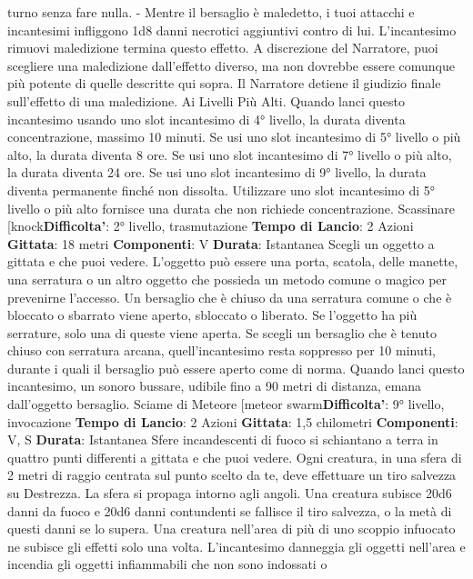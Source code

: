 \begin{multicols}{2}
turno senza fare nulla.
- Mentre il bersaglio è maledetto, i tuoi attacchi e
incantesimi infliggono 1d8 danni necrotici aggiuntivi
contro di lui.
L’incantesimo rimuovi maledizione termina questo
effetto. A discrezione del Narratore, puoi scegliere una
maledizione dall’effetto diverso, ma non dovrebbe
essere comunque più potente di quelle descritte qui
sopra. Il Narratore detiene il giudizio finale sull’effetto di una
maledizione.
Ai Livelli Più Alti. Quando lanci questo incantesimo
usando uno slot incantesimo di 4° livello, la durata
diventa concentrazione, massimo 10 minuti. Se usi uno
slot incantesimo di 5° livello o più alto, la durata diventa
8 ore. Se usi uno slot incantesimo di 7° livello o più alto,
la durata diventa 24 ore. Se usi uno slot incantesimo di
9° livello, la durata diventa permanente finché non
dissolta. Utilizzare uno slot incantesimo di 5° livello o
più alto fornisce una durata che non richiede
concentrazione.
Scassinare
[knock\textbf{Difficolta'}:
2° livello, trasmutazione
\textbf{Tempo di Lancio}: 2 Azioni
\textbf{Gittata}: 18 metri
\textbf{Componenti}: V
\textbf{Durata}: Istantanea
Scegli un oggetto a gittata e che puoi vedere. L’oggetto
può essere una porta, scatola, delle manette, una
serratura o un altro oggetto che possieda un metodo
comune o magico per prevenirne l’accesso.
Un bersaglio che è chiuso da una serratura comune o
che è bloccato o sbarrato viene aperto, sbloccato o
liberato. Se l’oggetto ha più serrature, solo una di
queste viene aperta.
Se scegli un bersaglio che è tenuto chiuso con
serratura arcana, quell’incantesimo resta soppresso per
10 minuti, durante i quali il bersaglio può essere aperto
come di norma.
Quando lanci questo incantesimo, un sonoro bussare,
udibile fino a 90 metri di distanza, emana dall’oggetto
bersaglio.
Sciame di Meteore
[meteor swarm\textbf{Difficolta'}:
9° livello, invocazione
\textbf{Tempo di Lancio}: 2 Azioni
\textbf{Gittata}: 1,5 chilometri
\textbf{Componenti}: V, S
\textbf{Durata}: Istantanea
Sfere incandescenti di fuoco si schiantano a terra in
quattro punti differenti a gittata e che puoi vedere. Ogni
creatura, in una sfera di 2 metri di raggio centrata sul
punto scelto da te, deve effettuare un tiro salvezza su
Destrezza. La sfera si propaga intorno agli angoli. Una
creatura subisce 20d6 danni da fuoco e 20d6 danni
contundenti se fallisce il tiro salvezza, o la metà di
questi danni se lo supera. Una creatura nell’area di più
di uno scoppio infuocato ne subisce gli effetti solo una
volta.
L’incantesimo danneggia gli oggetti nell’area e incendia
gli oggetti infiammabili che non sono indossati o

\end{multicols}
